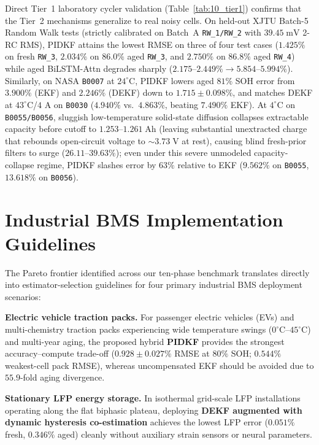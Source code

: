 \documentclass[11pt,a4paper]{article}
\begin{document}
Direct Tier~1 laboratory cycler validation (Table~\ref{tab:10_tier1}) confirms that the Tier~2 mechanisms generalize to real noisy cells. On held-out XJTU Batch-5 Random Walk tests (strictly calibrated on Batch~A \texttt{RW\_1/RW\_2} with $39.45\;\mathrm{mV}$ 2-RC RMS), PIDKF attains the lowest RMSE on three of four test cases ($1.425\%$ on fresh \texttt{RW\_3}, $2.034\%$ on $86.0\%$ aged \texttt{RW\_3}, and $2.750\%$ on $86.8\%$ aged \texttt{RW\_4}) while aged BiLSTM-Attn degrades sharply ($2.175\text{--}2.449\% \rightarrow 5.854\text{--}5.994\%$). Similarly, on NASA \texttt{B0007} at $24^\circ\text{C}$, PIDKF lowers aged $81\%$ SOH error from $3.900\%$ (EKF) and $2.246\%$ (DEKF) down to $1.715\pm0.098\%$, and matches DEKF at $43^\circ\text{C}$/$4\text{ A}$ on \texttt{B0030} ($4.940\%$ vs.\ $4.863\%$, beating $7.490\%$ EKF). At $4^\circ\text{C}$ on \texttt{B0055/B0056}, sluggish low-temperature solid-state diffusion collapses extractable capacity before cutoff to $1.253\text{--}1.261\;\mathrm{Ah}$ (leaving substantial unextracted charge that rebounds open-circuit voltage to $\sim 3.73\;\mathrm{V}$ at rest), causing blind fresh-prior filters to surge ($26.11\text{--}39.63\%$); even under this severe unmodeled capacity-collapse regime, PIDKF slashes error by $63\%$ relative to EKF ($9.562\%$ on \texttt{B0055}, $13.618\%$ on \texttt{B0056}).

\section{Industrial BMS Implementation Guidelines}
The Pareto frontier identified across our ten-phase benchmark translates directly into estimator-selection guidelines for four primary industrial BMS deployment scenarios:

\textbf{Electric vehicle traction packs.} For passenger electric vehicles (EVs) and multi-chemistry traction packs experiencing wide temperature swings ($0^\circ\text{C}\text{--}45^\circ\text{C}$) and multi-year aging, the proposed hybrid \textbf{PIDKF} provides the strongest accuracy--compute trade-off ($0.928\pm0.027\%$ RMSE at $80\%$ SOH; $0.544\%$ weakest-cell pack RMSE), whereas uncompensated EKF should be avoided due to $55.9$-fold aging divergence.

\textbf{Stationary LFP energy storage.} In isothermal grid-scale LFP installations operating along the flat biphasic plateau, deploying \textbf{DEKF augmented with dynamic hysteresis co-estimation} achieves the lowest LFP error ($0.051\%$ fresh, $0.346\%$ aged) cleanly without auxiliary strain sensors or neural parameters.
\end{document}
